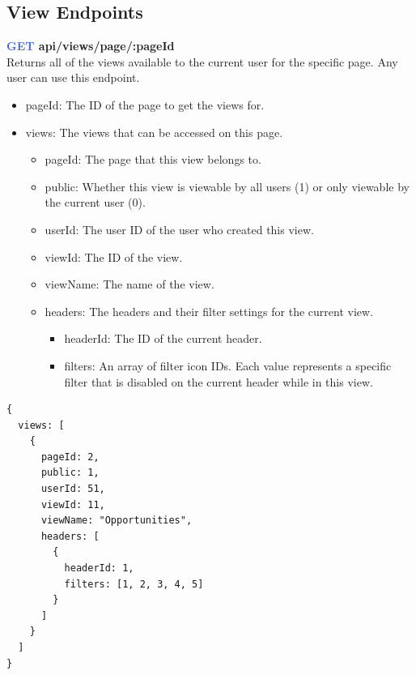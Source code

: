 \documentclass[onecolumn, draftclsnofoot,10pt, compsoc, usenames, dvipsnames]{IEEEtran}
\begin{document}
\subsection{View Endpoints}


\noindent
\textbf{\textcolor{RoyalBlue}{GET} api/views/page/:pageId} \\
Returns all of the views available to the current user for the specific page. Any user can use this endpoint.
\begin{itemize}
    \item pageId: The ID of the page to get the views for.
    \item views: The views that can be accessed on this page.
    \begin{itemize}
      \item pageId: The page that this view belongs to.
      \item public: Whether this view is viewable by all users (1) or only viewable by the current user (0).
      \item userId: The user ID of the user who created this view.
      \item viewId: The ID of the view.
      \item viewName: The name of the view.
      \item headers: The headers and their filter settings for the current view.
      \begin{itemize}
        \item headerId: The ID of the current header.
        \item filters: An array of filter icon IDs. Each value represents a specific filter that is disabled on the current header while in this view.
      \end{itemize}
    \end{itemize}
\end{itemize}

\begin{lstlisting}[caption=Example Response]
{
  views: [
    {
      pageId: 2,
      public: 1,
      userId: 51,
      viewId: 11,
      viewName: "Opportunities",
      headers: [
        {
          headerId: 1,
          filters: [1, 2, 3, 4, 5]
        }
      ]
    }
  ]
}
\end{lstlisting}
\\~\\
\end{document}
